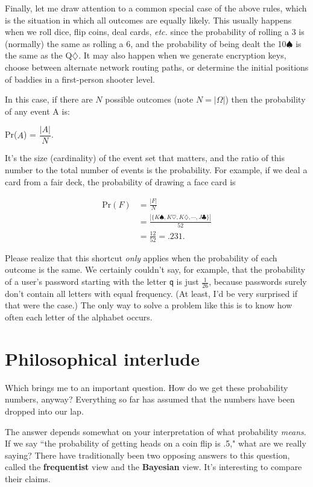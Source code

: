 Finally, let me draw attention to a common special case of the above rules,
which is the situation in which all outcomes are equally likely. This
usually happens when we roll dice, flip coins, deal cards, \textit{etc.}
since the probability of rolling a 3 is (normally) the same as rolling a 6,
and the probability of being dealt the 10$\spadesuit$ is the same as the
Q$\diamondsuit$. It may also happen when we generate encryption keys,
choose between alternate network routing paths, or determine the initial
positions of baddies in a first-person shooter level.

In this case, if there are $N$ possible outcomes (note $N=|\Omega|$) then
the probability of any event A is:

\begin{center}
Pr($A$) = $\dfrac{|A|}{N}$.
\end{center}

It's the size (cardinality) of the event set that matters, and the ratio of
this number to the total number of events is the probability. For example,
if we deal a card from a fair deck, the probability of drawing a face card
is

\begin{align*}
\text{Pr}(F) &= \frac{|F|}{N} \\[.1in]
&= \frac{|\{K\spadesuit,K\heartsuit,K\diamondsuit,\cdots,J\clubsuit\}|}{52} \\[.1in]
&= \frac{12}{52} = .231.
\end{align*}

Please realize that this shortcut \textit{only} applies when the
probability of each outcome is the same. We certainly couldn't say, for
example, that the probability of a user's password starting with the letter
\texttt{q} is just $\frac{1}{26}$, because passwords surely don't contain
all letters with equal frequency. (At least, I'd be very surprised if that
were the case.) The only way to solve a problem like this is to know how
often each letter of the alphabet occurs.

\section{Philosophical interlude}

Which brings me to an important question. How do we get these probability
numbers, anyway? Everything so far has assumed that the numbers have been
dropped into our lap.

The answer depends somewhat on your interpretation of what probability
\textit{means}. If we say ``the probability of getting heads on a coin flip
is .5," what are we really saying? There have traditionally been two
opposing answers to this question, called the \textbf{frequentist} view and
the \textbf{Bayesian} view. It's interesting to compare their claims.

